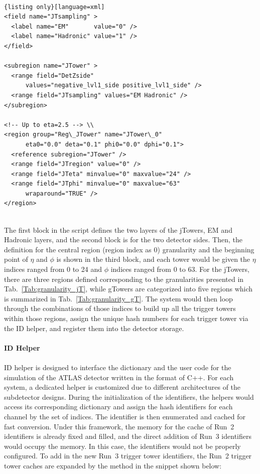 \\
\begin{lstlisting}{listing only}[language=xml]
<field name="JTsampling" > 
  <label name="EM"       value="0" /> 
  <label name="Hadronic" value="1" /> 
</field> 
	
<subregion name="JTower" > 
  <range field="DetZside"
      values="negative_lvl1_side positive_lvl1_side" /> 
  <range field="JTsampling" values="EM Hadronic" /> 
</subregion> 
	
<!-- Up to eta=2.5 --> \\
<region group="Reg\_JTower" name="JTower\_0" 
      eta0="0.0" deta="0.1" phi0="0.0" dphi="0.1"> 
  <reference subregion="JTower" /> 
  <range field="JTregion" value="0" /> 
  <range field="JTeta" minvalue="0" maxvalue="24" />
  <range field="JTphi" minvalue="0" maxvalue="63" 
      wraparound="TRUE" /> 
</region>
	
\end{lstlisting}
\noindent
The first block in the script defines the two layers of the jTowers, EM and Hadronic layers, and the second block is for the two detector sides. Then, the definition for the central region (region index as 0) granularity and the beginning point of $\eta$ and $\phi$ is shown in the third block, and each tower would be given the $\eta$ indices ranged from 0 to 24 and $\phi$ indices ranged from 0 to 63. For the jTowers, there are three regions defined corresponding to the granularities presented in Tab.~\ref{Tab:granularity_jT}, while gTowers are categorized into five regions which is summarized in Tab.~\ref{Tab:granularity_gT}. The system would then loop through the combinations of those indices to build up all the trigger towers within those regions, assign the unique hash numbers for each trigger tower via the ID helper, and register them into the detector storage\cite{Calafiura:2003gf}.
\\
\\{\bf ID Helper}
\\
\\ID helper is designed to interface the dictionary and the user code for the simulation of the ATLAS detector written in the format of C++. For each system, a dedicated helper is customized due to different architectures of the subdetector designs. During the initialization of the identifiers, the helpers would access its corresponding dictionary and assign the hash identifiers for each channel by the set of indices. The identifier is then enumerated and cached for fast conversion. Under this framework, the memory for the cache of Run~2 identifiers is already fixed and filled, and the direct addition of Run~3 identifiers would occupy the memory. In this case, the identifiers would not be properly configured. To add in the new Run~3 trigger tower identifiers, the Run~2 trigger tower caches are expanded by the method in the snippet shown below:
